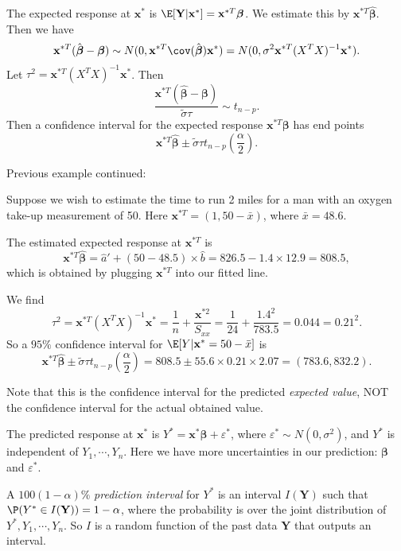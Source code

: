 \documentclass[a4paper]{article}
\begin{document}
The expected response at $\mathbf{x}^*$ is $\E[\mathbf{Y}|\mathbf{x}^*] = \mathbf{x}^{*T}\boldsymbol\beta$. We estimate this by $\mathbf{x}^{*T}\hat{\boldsymbol\beta}$. Then we have
\[
  \mathbf{x}^{*T}(\hat{\boldsymbol\beta} - \boldsymbol\beta)\sim N(0, \mathbf{x}^{*T} \cov(\hat{\boldsymbol\beta})\mathbf{x}^*) = N(0, \sigma^2\mathbf{x}^{*T}(X^TX)^{-1}\mathbf{x}^*).
\]
Let $\tau^2 = \mathbf{x}^{*T} (X^TX)^{-1}\mathbf{x}^*$. Then
\[
  \frac{\mathbf{x}^{*T}(\hat{\boldsymbol\beta} - \boldsymbol\beta)}{\tilde{\sigma}\tau}\sim t_{n - p}.
\]
Then a confidence interval for the expected response $\mathbf{x}^{*T}\boldsymbol\beta$ has end points
\[
  \mathbf{x}^{*T}\hat{\boldsymbol\beta} \pm \tilde{\sigma}\tau t_{n - p}\left(\frac{\alpha}{2}\right).
\]
\begin{eg}
  Previous example continued:

  Suppose we wish to estimate the time to run 2 miles for a man with an oxygen take-up measurement of 50. Here $\mathbf{x}^{*T} = (1, 50 - \bar x)$, where $\bar x = 48.6$.

  The estimated expected response at $\mathbf{x}^{*T}$ is
  \[
    \mathbf{x}^{*T}\hat{\boldsymbol\beta} = \hat{a}' + (50 - 48.5)\times \hat{b} = 826.5 - 1.4\times 12.9 = 808.5,
  \]
  which is obtained by plugging $\mathbf{x}^{*T}$ into our fitted line.

  We find
  \[
    \tau^2 = \mathbf{x}^{*T}(X^TX)^{-1}\mathbf{x}^* = \frac{1}{n} + \frac{\mathbf{x}^{*2}}{S_{xx}} = \frac{1}{24} + \frac{1.4^2}{783.5} = 0.044 = 0.21^2.
  \]
  So a $95\%$ confidence interval for $\E[Y|\mathbf{x}^* = 50 - \bar x]$ is
  \[
    \mathbf{x}^{*T}\hat{\boldsymbol\beta}\pm \tilde{\sigma}\tau t_{n - p}\left(\frac{\alpha}{2}\right) = 808.5 \pm 55.6 \times 0.21 \times 2.07 = (783.6, 832.2).
  \]
\end{eg}
Note that this is the confidence interval for the predicted \emph{expected value}, NOT the confidence interval for the actual obtained value.

The predicted response at $\mathbf{x}^*$ is $Y^* = \mathbf{x}^*\boldsymbol\beta + \varepsilon^*$, where $\varepsilon^*\sim N(0, \sigma^2)$, and $Y^*$ is independent of $Y_1, \cdots, Y_n$. Here we have more uncertainties in our prediction: $\boldsymbol\beta$ and $\varepsilon^*$.

A $100(1 - \alpha)\%$ \emph{prediction interval} for $Y^*$ is an interval $I(\mathbf{Y})$ such that $\P(Y^*\in I(\mathbf{Y})) = 1 - \alpha$, where the probability is over the joint distribution of $Y^*, Y_1, \cdots, Y_n$. So $I$ is a random function of the past data $\mathbf{Y}$ that outputs an interval.
\end{document}
